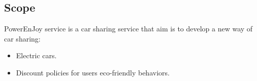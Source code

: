 \documentclass[english]{article}
\newcommand{\staff}{\textit{staff }}
\newcommand{\service}{\textit{service }}
\newcommand{\safeareas}{\textit{safe areas }}
\newcommand{\reservation}{\textit{reservation }}
\begin{document}
  
 \subsection{Scope}
 


PowerEnJoy service is a car sharing service that aim is to develop a new way of car sharing:
\begin{itemize}
	\item Electric cars.
	\item Discount policies for users eco-friendly behaviors.
\end{itemize}
\end{document}
